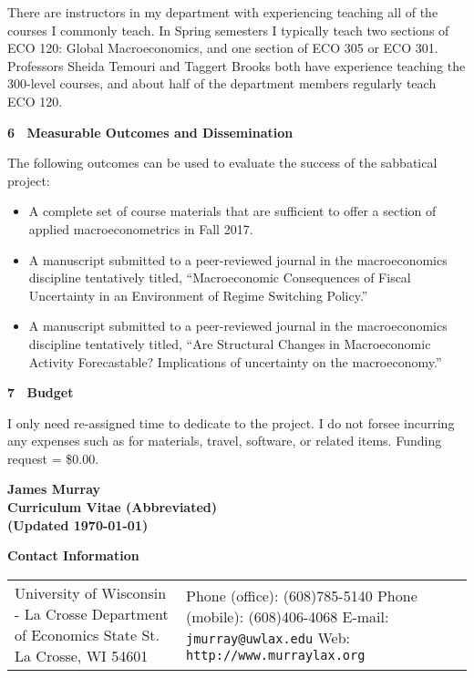 \documentclass[11pt]{article}
\newcommand{\bi}{\begin{itemize}}
\newcommand{\ei}{\end{itemize}}
\newcommand{\toprule}{\par\vspace*{2pt}\noindent{\hrule\hfill}\par\vspace*{1pt}}
\begin{document}
There are instructors in my department with experiencing teaching all of the courses I commonly teach.  In Spring semesters I typically teach two sections of ECO 120: Global Macroeconomics, and one section of ECO 305 or ECO 301.  Professors Sheida Temouri and Taggert Brooks both have experience teaching the 300-level courses, and about half of the department members regularly teach ECO 120.

\textbf{6~ Measurable Outcomes and Dissemination}

The following outcomes can be used to evaluate the success of the sabbatical project:
\bi
\item A complete set of course materials that are sufficient to offer a section of applied macroeconometrics in Fall 2017.
\item A manuscript submitted to a peer-reviewed journal in the macroeconomics discipline tentatively titled, ``Macroeconomic Consequences of Fiscal Uncertainty in an Environment of Regime Switching Policy.''
\item A manuscript submitted to a peer-reviewed journal in the macroeconomics discipline tentatively titled, ``Are Structural Changes in Macroeconomic Activity Forecastable?  Implications of uncertainty on the macroeconomy.''
  \ei

\textbf{7~ Budget}

I only need re-assigned time to dedicate to the project.  I do not forsee incurring any expenses such as for materials, travel, software, or related items.  Funding request = \$0.00. 
  
\begin{singlespace}


\end{singlespace}

\newpage
\setlength{\parskip}{0pc}

\begin{center} 
\textbf{\Large{James Murray}}\\
\textbf{Curriculum Vitae (Abbreviated)}\\
\textbf{(Updated \today)}\end{center}
\small 

\textbf{Contact Information} \toprule
\hspace*{-0.5pc}\begin{tabular}{p{3.4in} p{3in}}
University of Wisconsin - La Crosse\newline
Department of Economics \newline
1725 State St. \newline
La Crosse, WI  54601
&
Phone (office): (608)785-5140\newline
Phone (mobile): (608)406-4068\newline
E-mail: \texttt{jmurray@uwlax.edu}\newline
Web: \texttt{http://www.murraylax.org}
\end{tabular} \\ \\
\end{document}
